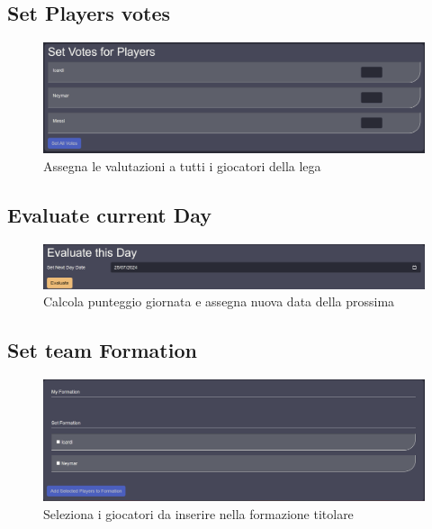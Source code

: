 \documentclass[twoside,openright,titlepage,fleqn,headinclude,12pt,a4paper,BCOR=5mm,footinclude]{scrbook}
\begin{document}
\subsection{Set Players votes}

\begin{figure}[H]
  \centering
  \includegraphics[width=\linewidth]{images/setVotes.png}
  \caption{Assegna le valutazioni a tutti i giocatori della lega}
  \label{fig:setVotes}
\end{figure}

\subsection{Evaluate current Day}

\begin{figure}[H]
  \centering
  \includegraphics[width=\linewidth]{images/evaluateDay.png}
  \caption{Calcola punteggio giornata e assegna nuova data della prossima}
  \label{fig:evaluate}
\end{figure}

\subsection{Set team Formation}

\begin{figure}[H]
  \centering
  \includegraphics[width=\linewidth]{images/setFormation.png}
  \caption{Seleziona i giocatori da inserire nella formazione titolare}
  \label{fig:setFormation}
\end{figure}
\end{document}
